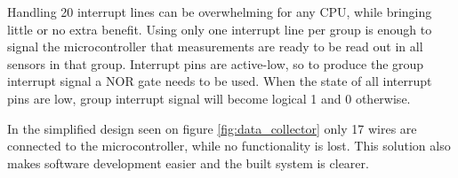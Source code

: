 Handling 20 interrupt lines can be overwhelming for any CPU, while bringing little or no extra
benefit. Using only one interrupt line per group is enough to signal the microcontroller that 
measurements are ready to be read out in all sensors in that group. Interrupt pins are active-low,
so to produce the group interrupt signal a NOR gate needs to be used. When the state of all interrupt
pins are low, group interrupt signal will become logical 1 and 0 otherwise.

In the simplified design seen on figure \ref{fig:data_collector} only 17 wires are connected to
the microcontroller, while no functionality is lost. This solution also makes software development
easier and the built system is clearer.



